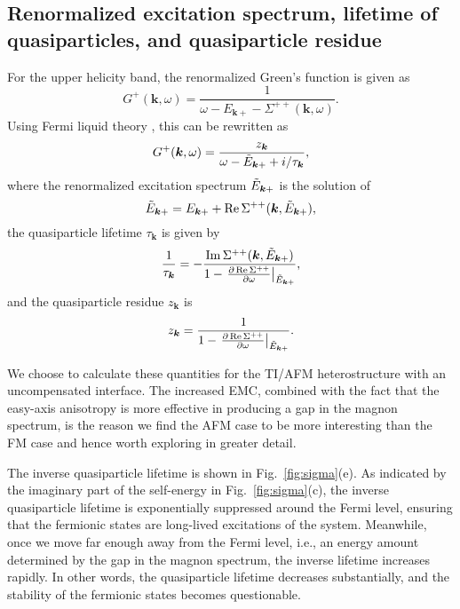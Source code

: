 \documentclass[aps, prb, twocolumn,amsmath,amssymb,floatfix]{revtex4-2}
\begin{document}
\subsection{Renormalized excitation spectrum, lifetime of quasiparticles, and quasiparticle residue} \label{sec:FLT} %
For the upper helicity band, the renormalized Green's function is given as \cite{BruusFlensberg, migdal}
\begin{equation}\label{eq:renormGreens}
    G^+(\boldsymbol{k}, \omega) = \frac{1}{\omega - E_{\boldsymbol{k}+}-\Sigma^{++}(\boldsymbol{k}, \omega)}.
\end{equation}
Using Fermi liquid theory \cite{BruusFlensberg}, this can be rewritten as
\begin{equation}
    G^+(\boldsymbol{k}, \omega) = \frac{z_{\boldsymbol{k}}}{\omega-\Tilde{E}_{\boldsymbol{k}+}+i/\tau_{\boldsymbol{k}}},
\end{equation}
where the renormalized excitation spectrum $\Tilde{E}_{\boldsymbol{k}+} $ is the solution of
\begin{equation}
\label{eq:renormalized}
    \Tilde{E}_{\boldsymbol{k}+}  = E_{\boldsymbol{k}+} + \Re\Sigma^{++}(\boldsymbol{k}, \Tilde{E}_{\boldsymbol{k}+} ) ,
\end{equation}
the quasiparticle lifetime $\tau_{\boldsymbol{k}}$ is given by
\begin{equation}
\label{eq:tau}
    \frac{1}{\tau_{\boldsymbol{k}}} =  - \frac{\Im\Sigma^{++}(\boldsymbol{k}, \Tilde{E}_{\boldsymbol{k}+} )}{1-\left.\pdv{\Re\Sigma^{++}}{\omega}\right\vert_{\Tilde{E}_{\boldsymbol{k}+} }},
\end{equation}
and the quasiparticle residue $z_{\boldsymbol{k}}$ is
\begin{equation}
\label{eq:residue}
    z_{\boldsymbol{k}} = \frac{1}{1-\left.\pdv{\Re\Sigma^{++}}{\omega}\right\vert_{\Tilde{E}_{\boldsymbol{k}+} }}.
\end{equation}

We choose to calculate these quantities for the TI/AFM heterostructure with an uncompensated interface. The increased EMC, combined with the fact that the easy-axis anisotropy is more effective in producing a gap in the magnon spectrum, is the reason we find the AFM case to be more interesting than the FM case and hence worth exploring in greater detail.

The inverse quasiparticle lifetime is shown in Fig.~\ref{fig:sigma}(e). As indicated by the imaginary part of the self-energy in Fig.~\ref{fig:sigma}(c), the inverse quasiparticle lifetime is exponentially suppressed around the Fermi level, ensuring that the fermionic states are long-lived excitations of the system. Meanwhile, once we move far enough away from the Fermi level, i.e., an energy amount determined by the gap in the magnon spectrum, the inverse lifetime increases rapidly. In other words, the quasiparticle lifetime decreases substantially, and the stability of the fermionic states becomes questionable. 
\end{document}
